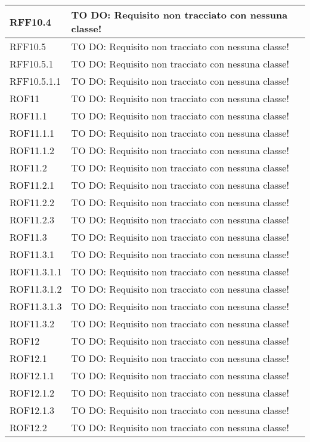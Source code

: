 \begin{center}
\begin{longtable}{| p{2.5cm} | p{11cm} |}
\hline
RFF10.4 & TO DO: Requisito non tracciato con nessuna classe! \\
\hline
RFF10.5 & TO DO: Requisito non tracciato con nessuna classe! \\
\hline
RFF10.5.1 & TO DO: Requisito non tracciato con nessuna classe! \\
\hline
RFF10.5.1.1 & TO DO: Requisito non tracciato con nessuna classe! \\
\hline
ROF11 & TO DO: Requisito non tracciato con nessuna classe! \\
\hline
ROF11.1 & TO DO: Requisito non tracciato con nessuna classe! \\
\hline
ROF11.1.1 & TO DO: Requisito non tracciato con nessuna classe! \\
\hline
ROF11.1.2 & TO DO: Requisito non tracciato con nessuna classe! \\
\hline
ROF11.2 & TO DO: Requisito non tracciato con nessuna classe! \\
\hline
ROF11.2.1 & TO DO: Requisito non tracciato con nessuna classe! \\
\hline
ROF11.2.2 & TO DO: Requisito non tracciato con nessuna classe! \\
\hline
ROF11.2.3 & TO DO: Requisito non tracciato con nessuna classe! \\
\hline
ROF11.3 & TO DO: Requisito non tracciato con nessuna classe! \\
\hline
ROF11.3.1 & TO DO: Requisito non tracciato con nessuna classe! \\
\hline
ROF11.3.1.1 & TO DO: Requisito non tracciato con nessuna classe! \\
\hline
ROF11.3.1.2 & TO DO: Requisito non tracciato con nessuna classe! \\
\hline
ROF11.3.1.3 & TO DO: Requisito non tracciato con nessuna classe! \\
\hline
ROF11.3.2 & TO DO: Requisito non tracciato con nessuna classe! \\
\hline
ROF12 & TO DO: Requisito non tracciato con nessuna classe! \\
\hline
ROF12.1 & TO DO: Requisito non tracciato con nessuna classe! \\
\hline
ROF12.1.1 & TO DO: Requisito non tracciato con nessuna classe! \\
\hline
ROF12.1.2 & TO DO: Requisito non tracciato con nessuna classe! \\
\hline
ROF12.1.3 & TO DO: Requisito non tracciato con nessuna classe! \\
\hline
ROF12.2 & TO DO: Requisito non tracciato con nessuna classe! \\

\end{longtable}
\end{center}

